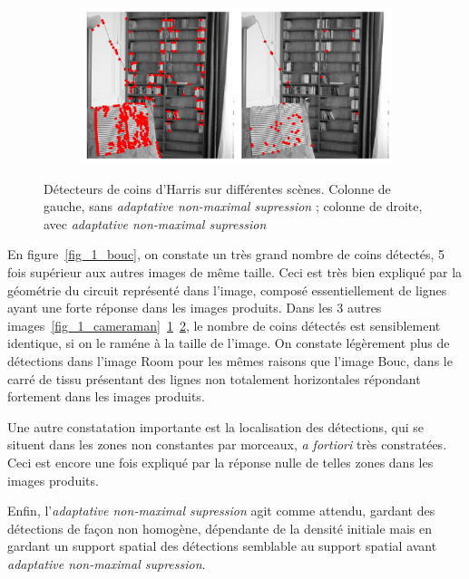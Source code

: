 \documentclass[12pt,a4paper,onecolumn]{article}
\begin{document}
\begin{figure}[H]
\begin{subfigure}[b]{\textwidth}
		\label{fig_1_lena}
	\end{subfigure}
	\begin{subfigure}[b]{\textwidth}
		\centering
		\includegraphics[height = 0.20\textheight]{1_room}
		\label{fig_1_room}
	\end{subfigure}
	\caption{Détecteurs de coins d'Harris sur différentes scènes. Colonne de gauche, sans \textit{adaptative non-maximal supression} ; colonne de droite, avec \textit{adaptative non-maximal supression}}
	\label{fig_1}
\end{figure}
En figure~\ref{fig_1_bouc}, on constate un très grand nombre de coins détectés, 5 fois supérieur aux autres images de même taille. Ceci est très bien expliqué par la géométrie du circuit représenté dans l'image, composé essentiellement de lignes ayant une forte réponse dans les images produits. Dans les 3 autres images~\ref{fig_1_cameraman}~\ref{fig_1_lena}~\ref{fig_1_room}, le nombre de coins détectés est sensiblement identique, si on le raméne à la taille de l'image. On constate légèrement plus de détections dans l'image Room pour les mêmes raisons que l'image Bouc, dans le carré de tissu présentant des lignes non totalement horizontales répondant fortement dans les images produits.

Une autre constatation importante est la localisation des détections, qui se situent dans les zones non constantes par morceaux, \textit{a fortiori} très constratées. Ceci est encore une fois expliqué par la réponse nulle de telles zones dans les images produits.

Enfin, l'\textit{adaptative non-maximal supression} agit comme attendu, gardant des détections de façon non homogène, dépendante de la densité initiale mais en gardant un support spatial des détections semblable au support spatial avant \textit{adaptative non-maximal supression}.
\end{document}
